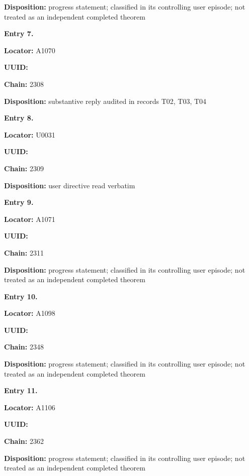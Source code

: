 \textbf{Disposition:} progress statement; classified in its controlling
user episode; not treated as an independent completed theorem


\textbf{Entry 7.}

\textbf{Locator:} A1070

\textbf{UUID:} \protect{}

\textbf{Chain:} 2308

\textbf{Disposition:} substantive reply audited in records T02, T03, T04


\textbf{Entry 8.}

\textbf{Locator:} U0031

\textbf{UUID:} \protect{}

\textbf{Chain:} 2309

\textbf{Disposition:} user directive read verbatim


\textbf{Entry 9.}

\textbf{Locator:} A1071

\textbf{UUID:} \protect{}

\textbf{Chain:} 2311

\textbf{Disposition:} progress statement; classified in its controlling
user episode; not treated as an independent completed theorem


\textbf{Entry 10.}

\textbf{Locator:} A1098

\textbf{UUID:} \protect{}

\textbf{Chain:} 2348

\textbf{Disposition:} progress statement; classified in its controlling
user episode; not treated as an independent completed theorem


\textbf{Entry 11.}

\textbf{Locator:} A1106

\textbf{UUID:} \protect{}

\textbf{Chain:} 2362

\textbf{Disposition:} progress statement; classified in its controlling
user episode; not treated as an independent completed theorem

